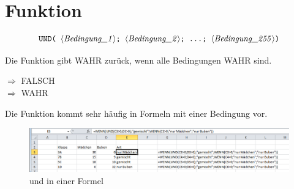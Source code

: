 \section{  Funktion}

$$ \text{\stmt{UND( \syntax{Bedingung\_1}; \syntax{Bedingung\_2}; \ldots; \syntax{Bedingung\_255})}} $$

Die  Funktion gibt WAHR zurück, wenn alle Bedingungen WAHR sind.

\begin{description}[labelindent=0cm, leftmargin=3cm, font=\mdseries, labelwidth=3cm,style=nextline]
\item[Beispiele]  $\Rightarrow$ FALSCH\\
 $\Rightarrow$ WAHR
\end{description}
%
Die  Funktion kommt sehr häufig in Formeln mit einer  Bedingung vor.
%
	\begin{figure}[H]
		\centering
			\includegraphics[width=16cm]{images/und_mit_wenn_b}
		\caption{ und  in einer Formel}
		\label{fig:wenn_mit_und}
	\end{figure}
